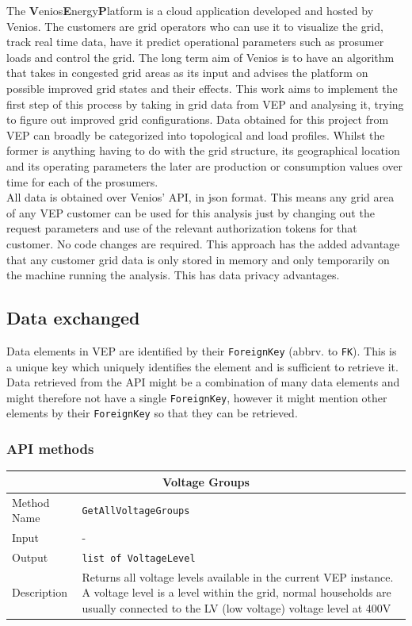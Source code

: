 The \textbf{V}enios\textbf{E}nergy\textbf{P}latform is a cloud application
developed and hosted by Venios. The customers are grid operators who can use
it to visualize the grid, track real time data, have it predict 
operational parameters such as prosumer loads and control the grid.
The long term aim of Venios is to have an algorithm that takes in
congested grid areas as its input and advises the platform on possible improved
grid states and their effects. This work aims to implement the first step of this
process by taking in grid data from VEP and analysing it, trying to figure out
improved grid configurations. Data obtained for this project from VEP can broadly
be categorized
into topological and load profiles. Whilst the former is anything having to do with
the grid structure, its geographical location and its operating parameters the later
are production or consumption values over time for each of the prosumers.\\
All data is obtained over Venios' API, in json format. This means any
grid area of any VEP customer can be used for this analysis just by changing out
the request parameters and use of the relevant authorization tokens for that customer.
No code changes are required. This approach has the added advantage that any customer grid
data is only stored in memory and only temporarily on the machine running the analysis. This
has data privacy advantages.

\subsection{Data exchanged}

Data elements in VEP are identified by their \texttt{ForeignKey} (abbrv. to \texttt{FK}). This is a unique key which
uniquely identifies the element and is sufficient to retrieve it. Data retrieved from the API might
be a combination of many data elements and might therefore not have a single \texttt{ForeignKey}, however
it might mention other elements by their \texttt{ForeignKey} so that they can be retrieved.

\subsubsection{API methods}

\begin{tabular}{ l  p{12cm}} 
    \hline
    \multicolumn{2}{c}{\textbf{Voltage Groups}}\\
    \hline
    Method Name     & \texttt{GetAllVoltageGroups} \\
    Input           & -\\
    Output          & \texttt{list of VoltageLevel} \\
    Description     & Returns all voltage levels available in the current VEP instance. A voltage level is a level within the grid, normal households are usually connected to the LV (low voltage) voltage level at 400V\\
\end{tabular}


